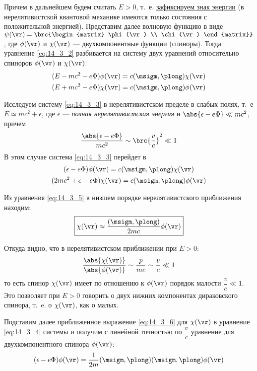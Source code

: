 Причем в дальнейшем будем считать $E>0$, т.~е. \underline{зафиксируем знак энергии} (в нерелятивистской квантовой механике имеются только состояния с положительной энергией). Представим далее волновую функцию в виде $\psi(\vr) = \brc{\begin{matrix} \phi(\vr) \\ \chi(\vr) \end{matrix}}$, где $\phi(\vr)$ и $\chi(\vr)$ --- двухкомпонентные функции (спиноры). Тогда уравнение \eqref{eq:14_3_2} разбивается на систему двух уравнений относительно спиноров $\phi(\vr)$ и $\chi(\vr)$:
\begin{gather}
\label{eq:14_3_3}
(E - mc^2 - e\Phi) \phi(\vr) = c(\msigm, \plong) \chi(\vr) \\
(E + mc^2 - e\Phi) \chi(\vr) = c(\msigm, \plong) \phi(\vr) \nonumber
\end{gather}
 
Исследуем систему \eqref{eq:14_3_3} в нерелятивистском пределе в слабых полях, т.~е $E \simeq mc^2 + \epsilon$, где $\epsilon$ --- {\em полная нерелятивистская энергия} и $\abs{\epsilon - e\Phi} \ll mc^2$, причем  
$$
\frac{\abs{\epsilon - e\Phi}}{mc^2} \sim \brc{\frac{v}{c}}^2 \ll 1
$$
В этом случае система \eqref{eq:14_3_3} перейдет в 
\begin{gather}
\label{eq:14_3_4}
(\epsilon - e\Phi) \phi(\vr) = c(\msigm, \plong) \chi(\vr) \\
\label{eq:14_3_5}
(2mc^2 + \epsilon - e\Phi) \chi(\vr) = c(\msigm, \plong) \phi(\vr)
\end{gather}

Из уравнения \eqref{eq:14_3_5} в низшем порядке нерелятивистского приближения находим:
\begin{equation}
\label{eq:14_3_6}
\boxed{\chi(\vr) \approx \frac{(\msigm, \plong)}{2mc} \phi(\vr)}
\end{equation}

Откуда видно, что в нерелятивистском приближении при $E > 0$:
$$
\frac{\abs{\chi(\vr)}}{\abs{\phi(\vr)}} \sim \frac{p}{mc}  \sim \frac{v}{c} \ll 1
$$
то есть спинор $\chi(\vr)$ имеет по отношению к $\phi(\vr)$ порядок малости $\dfrac{v}{c} \ll 1$. Это позволяет при $E > 0$ говорить о двух нижних компонентах дираковского спинора, т.~e. о $\chi(\vr)$, как о малых.

Подставим далее приближенное выражение \eqref{eq:14_3_6} для $\chi(\vr)$ в уравнение \eqref{eq:14_3_4} системы и получим с линейной точностью по $\dfrac{v}{c}$ уравнение для двухкомпонентного спинора $\phi(\vr)$:
\begin{equation}
\label{eq:14_3_7}
(\epsilon - e\Phi)\phi(\vr) = \frac{1}{2m}(\msigm, \plong)(\msigm, \plong) \phi(\vr)
\end{equation}


